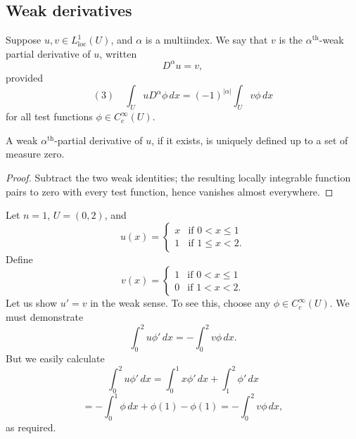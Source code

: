 \subsection{Weak derivatives}

\begin{definition}
\label{def:weak-partial-derivative}
Suppose $u, v \in L^1_{\text{loc}}(U)$, and $\alpha$ is a multiindex. We say that $v$ is the $\alpha^{\text{th}}$-weak partial derivative of $u$, written
$$D^\alpha u = v,$$
provided
$$(3) \quad \int_U u D^\alpha \phi \, dx = (-1)^{|\alpha|} \int_U v\phi \, dx$$
for all test functions $\phi \in C_c^\infty(U)$.
\end{definition}

\begin{lemma}
\label{lem:weak-derivative-uniqueness}

A weak $\alpha^{\text{th}}$-partial derivative of $u$, if it exists, is uniquely defined up to a set of measure zero.
\end{lemma}

\begin{proof}
\sketch Subtract the two weak identities; the resulting locally integrable function pairs to zero with every test function, hence vanishes almost everywhere.
\end{proof}

\begin{example}
\label{ex:weak-derivative-piecewise-linear-example}

Let $n = 1$, $U = (0,2)$, and
$$u(x) = \begin{cases}
x & \text{if } 0 < x \le 1 \\
1 & \text{if } 1 \le x < 2.
\end{cases}$$
Define
$$v(x) = \begin{cases}
1 & \text{if } 0 < x \le 1 \\
0 & \text{if } 1 < x < 2.
\end{cases}$$
Let us show $u' = v$ in the weak sense. To see this, choose any $\phi \in C_c^\infty(U)$. We must demonstrate
$$\int_0^2 u\phi' \, dx = -\int_0^2 v\phi \, dx.$$
But we easily calculate
$$\int_0^2 u\phi' \, dx = \int_0^1 x\phi' \, dx + \int_1^2 \phi' \, dx$$
$$= -\int_0^1 \phi \, dx + \phi(1) - \phi(1) = -\int_0^2 v\phi \, dx,$$
as required.
\end{example}

